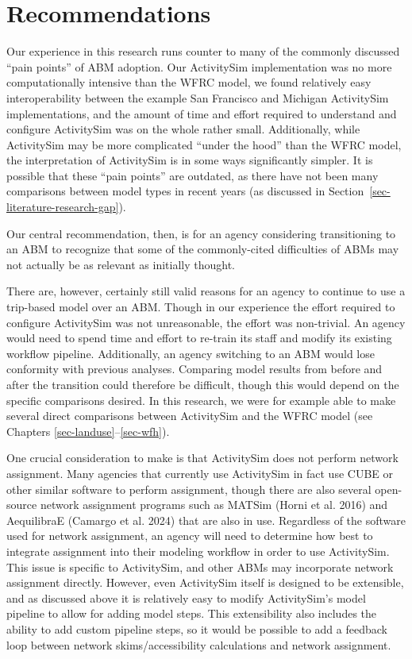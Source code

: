 \documentclass[fancy, twoside, mastersfancy, ms]{byuthesis}
\begin{document}
\section{Recommendations}\label{recommendations}

Our experience in this research runs counter to many of the commonly
discussed ``pain points'' of ABM adoption. Our ActivitySim
implementation was no more computationally intensive than the WFRC
model, we found relatively easy interoperability between the example San
Francisco and Michigan ActivitySim implementations, and the amount of
time and effort required to understand and configure ActivitySim was on
the whole rather small. Additionally, while ActivitySim may be more
complicated ``under the hood'' than the WFRC model, the interpretation
of ActivitySim is in some ways significantly simpler. It is possible
that these ``pain points'' are outdated, as there have not been many
comparisons between model types in recent years (as discussed in
Section~\ref{sec-literature-research-gap}).

Our central recommendation, then, is for an agency considering
transitioning to an ABM to recognize that some of the commonly-cited
difficulties of ABMs may not actually be as relevant as initially
thought.

There are, however, certainly still valid reasons for an agency to
continue to use a trip-based model over an ABM. Though in our experience
the effort required to configure ActivitySim was not unreasonable, the
effort was non-trivial. An agency would need to spend time and effort to
re-train its staff and modify its existing workflow pipeline.
Additionally, an agency switching to an ABM would lose conformity with
previous analyses. Comparing model results from before and after the
transition could therefore be difficult, though this would depend on the
specific comparisons desired. In this research, we were for example able
to make several direct comparisons between ActivitySim and the WFRC
model (see Chapters \ref{sec-landuse}--\ref{sec-wfh}).

One crucial consideration to make is that ActivitySim does not perform
network assignment. Many agencies that currently use ActivitySim in fact
use CUBE or other similar software to perform assignment, though there
are also several open-source network assignment programs such as MATSim
(Horni et al. 2016) and AequilibraE (Camargo et al. 2024) that are also
in use. Regardless of the software used for network assignment, an
agency will need to determine how best to integrate assignment into
their modeling workflow in order to use ActivitySim. This issue is
specific to ActivitySim, and other ABMs may incorporate network
assignment directly. However, even ActivitySim itself is designed to be
extensible, and as discussed above it is relatively easy to modify
ActivitySim's model pipeline to allow for adding model steps. This
extensibility also includes the ability to add custom pipeline steps, so
it would be possible to add a feedback loop between network
skims/accessibility calculations and network assignment.
\end{document}
